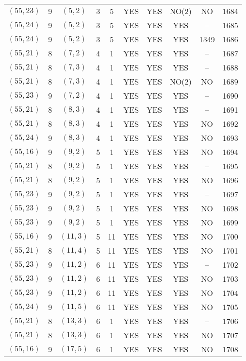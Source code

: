 \begin{longtable}{|c|c|c|c|c|c|c|c|c|c|}
$(55, 23)$ & 9 & $(5, 2)$ & 3 & 5 & YES & YES & NO(2) & NO & 1684\\
$(55, 24)$ & 9 & $(5, 2)$ & 3 & 5 & YES & YES & YES & -- & 1685\\
$(55, 24)$ & 9 & $(5, 2)$ & 3 & 5 & YES & YES & YES & 1349 & 1686\\
$(55, 21)$ & 8 & $(7, 2)$ & 4 & 1 & YES & YES & YES & -- & 1687\\
$(55, 21)$ & 8 & $(7, 3)$ & 4 & 1 & YES & YES & YES & -- & 1688\\
$(55, 21)$ & 8 & $(7, 3)$ & 4 & 1 & YES & YES & NO(2) & NO & 1689\\
$(55, 23)$ & 9 & $(7, 2)$ & 4 & 1 & YES & YES & YES & -- & 1690\\
$(55, 21)$ & 8 & $(8, 3)$ & 4 & 1 & YES & YES & YES & -- & 1691\\
$(55, 21)$ & 8 & $(8, 3)$ & 4 & 1 & YES & YES & YES & NO & 1692\\
$(55, 24)$ & 9 & $(8, 3)$ & 4 & 1 & YES & YES & YES & NO & 1693\\
$(55, 16)$ & 9 & $(9, 2)$ & 5 & 1 & YES & YES & YES & NO & 1694\\
$(55, 21)$ & 8 & $(9, 2)$ & 5 & 1 & YES & YES & YES & -- & 1695\\
$(55, 21)$ & 8 & $(9, 2)$ & 5 & 1 & YES & YES & YES & NO & 1696\\
$(55, 23)$ & 9 & $(9, 2)$ & 5 & 1 & YES & YES & YES & -- & 1697\\
$(55, 23)$ & 9 & $(9, 2)$ & 5 & 1 & YES & YES & YES & NO & 1698\\
$(55, 23)$ & 9 & $(9, 2)$ & 5 & 1 & YES & YES & YES & NO & 1699\\
$(55, 16)$ & 9 & $(11, 3)$ & 5 & 11 & YES & YES & YES & NO & 1700\\
$(55, 21)$ & 8 & $(11, 4)$ & 5 & 11 & YES & YES & YES & NO & 1701\\
$(55, 23)$ & 9 & $(11, 2)$ & 6 & 11 & YES & YES & YES & -- & 1702\\
$(55, 23)$ & 9 & $(11, 2)$ & 6 & 11 & YES & YES & YES & NO & 1703\\
$(55, 23)$ & 9 & $(11, 2)$ & 6 & 11 & YES & YES & YES & NO & 1704\\
$(55, 24)$ & 9 & $(11, 5)$ & 6 & 11 & YES & YES & YES & NO & 1705\\
$(55, 21)$ & 8 & $(13, 3)$ & 6 & 1 & YES & YES & YES & -- & 1706\\
$(55, 21)$ & 8 & $(13, 3)$ & 6 & 1 & YES & YES & YES & NO & 1707\\
$(55, 16)$ & 9 & $(17, 5)$ & 6 & 1 & YES & YES & YES & NO & 1708\\

\end{longtable}
